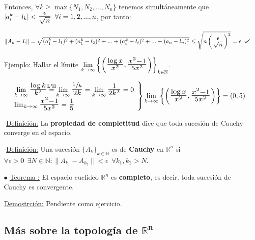 \documentclass[10pt, titlepage]{article}
\def\checkmark{\tikz\fill[scale=0.4](0,.35) -- (.25,0) -- (1,.7) -- (.25,.15) -- cycle;}
\newcommand{\eqc}[1]{\stackrel{\mathclap{\normalfont\mbox{\scriptsize{#1}}}}{=}}
\newcommand{\R}{\mathbb{R}}
\newcommand{\N}{\mathbb{N}}
\newcommand{\bfrac}[2]{\scalebox{1.4}{$\frac{#1}{#2}$}}
\newcommand{\spac}{\, \, \,}
\newcommand{\definicion}{\noindent-\underline{Definición:} }
\newcommand{\teorema}[1][\!\!]{\noindent$\bullet$ \underline{Teorema #1:} }
\begin{document}
\noindent Entonces, $\forall k \geq \max \{N_1, N_2,..., N_n\}$ tenemos simultáneamente que $|a_i^k - l_k| 
< \bfrac{\epsilon}{\sqrt{n}} \spac \forall i = 1, 2,..., n$, por tanto:
\vspace{1mm}

\noindent$\|A_k - L\| = \sqrt{(a_1^k - l_1)^2 + (a_1^k - l_2)^2 + ... + (a_i^k - l_i)^2 +... + (a_n - l_n)^2} 
\leq \sqrt{n \left (\bfrac{\epsilon}{\sqrt{n}}\right )^2} = \epsilon \spac \checkmark$
\vspace{3mm}

\underline{Ejemplo:} Hallar el límite $\displaystyle \lim_{k \to \infty} \left \{\left ( \bfrac{\log{x}}{x^2}, 
\bfrac{x^2-1}{5 x^2} \right )\right \}_{k \in \N}$.
\vspace{3mm}

\[
\left.\begin{array}{lc}\displaystyle

\lim_{k \to \infty} \bfrac{\log{k}}{k^2} \eqc{L'H} \lim_{k \to \infty} \bfrac{\sfrac{1}{k}}{2 k} = \lim_{k \to 
\infty} \bfrac{1}{2 k^2} = 0 \\

\lim_{k \to \infty} \bfrac{x^2 - 1}{5 x^2} = \bfrac{1}{5}

\end{array}\right \}
\displaystyle \lim_{k \to \infty} \left \{\left ( \bfrac{\log{x}}{x^2}, \bfrac{x^2-1}{5 x^2} \right )\right \} = 
(0, 5)
\]
\vspace{5mm}


\definicion La \textbf{propiedad de completitud} dice que toda sucesión de Cauchy converge en el espacio.
\vspace{5mm}

\definicion Una sucesión $\{ A_k\}_{k \in \N}$ es de \textbf{Cauchy} en $\R^n$ si $\forall \epsilon >0 \spac 
\exists N \in \N : \|A_{k_1} - A_{k_2}\| < \epsilon \spac \forall k_1, k_2 > N$.
\vspace{5mm}

\teorema El espacio euclídeo $\R^n$ es \textbf{completo}, es decir, toda sucesión de Cauchy es 
convergente.
\vspace{3mm}

\underline{Demostrción:} Pendiente como ejercicio.
\vspace{5mm}

\subsection{Más sobre la topología de $\mathbf{\R^n}$}
\vspace{5mm}
\end{document}
